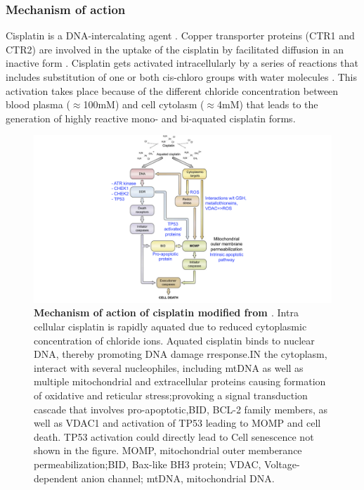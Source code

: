 \subsubsection{Mechanism of action}
Cisplatin is a DNA-intercalating agent \cite{dasari2014cisplatin, kartalou2001mechanisms}. Copper transporter proteins (CTR1 and CTR2) are involved in the uptake of the cisplatin by facilitated diffusion in an inactive form \cite{arnesano2018platinum,ishida2002uptake}. Cisplatin gets activated intracellularly by a series of reactions that includes substitution of one or both cis-chloro groups with water molecules \cite{el1999reactions}. This activation takes place because of the different chloride concentration between blood plasma ($\approx${100mM}) and cell cytolasm ($\approx${4mM}) that leads to the generation of highly reactive mono- and bi-aquated cisplatin forms.



\begin{figure}
\centering
\includegraphics[width=\textwidth]{Figures/CisplatinMA.png}
	\caption[Mechanism of action of cisplatin]
	{\small
	    \textbf{Mechanism of action of cisplatin modified from \cite{galluzzi2012molecular}}.
	     Intra cellular cisplatin is rapidly aquated due to reduced cytoplasmic concentration of chloride ions. Aquated cisplatin binds to nuclear DNA, thereby promoting DNA damage rresponse.IN the cytoplasm, interact with several nucleophiles, including mtDNA as well as multiple mitochondrial and extracellular proteins causing formation of oxidative and reticular stress;provoking a signal transduction cascade that involves pro-apoptotic,BID, BCL-2 family members, as well as VDAC1 and activation of TP53 leading to MOMP and cell death.
	    TP53 activation could directly lead to Cell senescence not shown in the figure. MOMP, mitochondrial outer memberance permeabilization;BID, Bax-like BH3 protein; VDAC, Voltage-dependent anion channel; mtDNA, mitochondrial DNA.
	}
	\label{fig:CisplatinMA}
\end{figure}


